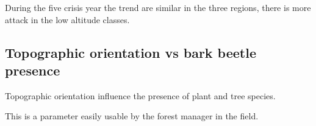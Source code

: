 \documentclass[3p,procedia]{elsarticle}
\begin{document}
During the five crisis year the trend are similar in the three regions, there is more attack in the low altitude classes. 



	


\subsection{Topographic orientation vs bark beetle presence}

Topographic orientation influence the presence of plant and tree species. 

This is a parameter easily usable by the forest manager in the field.  
\end{document}
